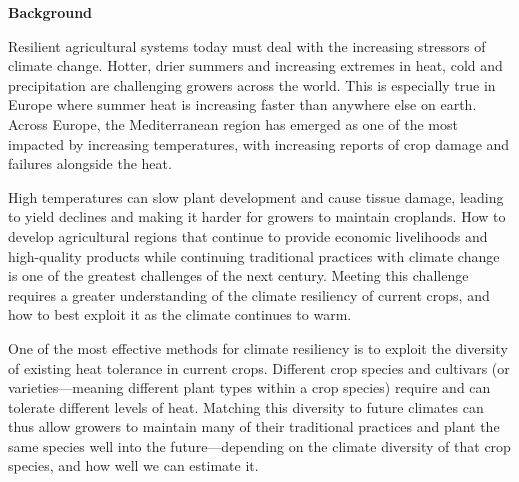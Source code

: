 \documentclass[11pt,letter,oneside]{article}
\begin{document}
{\bf Background}

Resilient agricultural systems today must deal with the increasing stressors of climate change.\cite{benitez2023enhancing,foley2011solutions} Hotter, drier summers and increasing extremes in heat, cold and precipitation are challenging growers across the world.\cite{ipcc2021} This is especially true in Europe where summer heat is increasing faster than anywhere else on earth.\cite{schumacher2024exacerbated} Across Europe, the Mediterranean region has emerged as one of the most impacted by increasing temperatures, with increasing reports of crop damage and failures alongside the heat.\cite{oltmanns2024,tuel2020mediterranean} 

High temperatures can slow plant development and cause tissue damage,\cite{coupel2024clusters} leading to yield declines and making it harder for growers to maintain croplands. 
How to develop agricultural regions that continue to provide economic livelihoods and high-quality products while continuing traditional practices with climate change is one of the greatest challenges of the next century. Meeting this challenge requires a greater understanding of the climate resiliency of current crops, and how to best exploit it as the climate continues to warm.  %

One of the most effective methods for climate resiliency is to exploit the diversity of existing heat tolerance in current crops.\cite{labeyrie2021role,van2019crop} Different crop species and cultivars (or varieties---meaning different plant types within a crop species) require and can tolerate different levels of heat.\cite{cooper2021,wahid2007} Matching this diversity to future climates can thus allow growers to maintain many of their traditional practices and plant the same species well into the future\cite{Wolkovich2017}---depending on the climate diversity of that crop species, and how well we can estimate it. 
\end{document}
